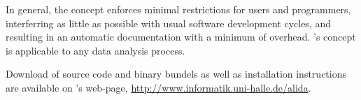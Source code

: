 In general, the \alida concept enforces minimal restrictions for users and
programmers, interferring as little as possible with usual software development
cycles, and resulting in an automatic documentation with a minimum of overhead.
\alida's concept is applicable to any data analysis process. 


Download of source code and binary bundels as well
as installation instructions are available on \alida's web-page, 
\url{http://www.informatik.uni-halle.de/alida}.
